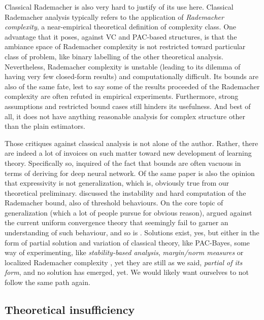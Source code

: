 Classical Rademacher is also very hard to justify of its use here. Classical Rademacher analysis typically refers to the application of \textit{Rademacher complexity}, a near-empirical theoretical definition of complexity class. One advantage that it poses, against VC and PAC-based structures, is that the ambiance space of Rademacher complexity is not restricted toward particular class of problem, like binary labelling of the other theoretical analysis. Nevertheless, Rademacher complexity is unstable (leading to its dilemma of having very few closed-form results) and computationally difficult. Its bounds are also of the same fate, lest to say some of the results proceeded of the Rademacher complexity are often refuted in empirical experiments. Furthermore, strong assumptions and restricted bound cases still hinders its usefulness. And best of all, it does not have anything reasonable analysis for complex structure other than the plain estimators. 

Those critiques against classical analysis is not alone of the author. Rather, there are indeed a lot of invoices on such matter toward new development of learning theory. Specifically so, \cite{zhang2017understandingdeeplearningrequires} inquired of the fact that bounds are often vacuous in terms of deriving for deep neural network. Of the same paper is also the opinion that expressivity is not generalization, which is, obviously true from our theoretical preliminary. \cite{truong2025rademachercomplexitybasedgeneralizationbounds} discussed the instability and hard computation of the Rademacher bound, also of threshold behaviours. On the core topic of generalization (which a lot of people pursue for obvious reason), \cite{nagarajan2021uniformconvergenceunableexplain} argued against the current uniform convergence theory that seemingly fail to garner an understanding of such behaviour, and so is \cite{tunali2019empirical}. Solutions exist, yes, but either in the form of partial solution and variation of classical theory, like PAC-Bayes, some way of experimenting, like \textit{stability-based analysis}, \textit{margin/norm measures} or localized Rademacher complexity \cite{bartlett2005local,bartlett2017spectrally,bousquet2002stability,neyshabur2015norm}, yet they are still as we said, \textit{partial of its form}, and no solution has emerged, yet. We would likely want ourselves to not follow the same path again. 

\subsection{Theoretical insufficiency}

